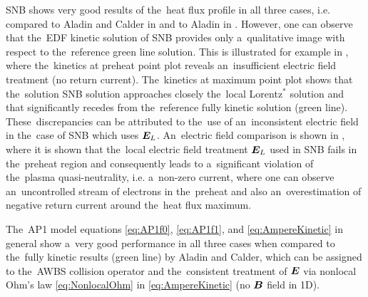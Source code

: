 SNB shows very good results of the~heat flux profile in all three cases, 
i.e. compared to Aladin and Calder in  
and to Aladin in . 
However, one can observe that the~EDF kinetic solution of SNB provides 
only a~qualitative image with respect to the~reference green line solution. 
This is illustrated for example in
, where the~kinetics at preheat point plot 
reveals an~insufficient electric field treatment (no return current). 
The~kinetics at maximum point plot shows that the~solution SNB solution
approaches closely the~local Lorentz$^*$ solution and that 
significantly recedes from the~reference fully kinetic solution (green line).
These~discrepancies can be attributed to the~use of an~inconsistent 
electric field in the~case of SNB which uses $\boldsymbol{E}_L$. An~electric field 
comparison is shown in , where it is shown that 
the~local electric field treatment $\boldsymbol{E}_L$ used in SNB fails 
in the~preheat region and consequently leads to 
a~significant violation of the~plasma quasi-neutrality,
i.e. a~non-zero current, where one can observe an~uncontrolled stream of 
electrons in the~preheat and also an~overestimation of negative return current
around the~heat flux maximum.

The~AP1 model equations \eqref{eq:AP1f0}, \eqref{eq:AP1f1}, 
and \eqref{eq:AmpereKinetic} in general show a~very good performance 
in all three cases when compared to the~fully kinetic results 
(green line) by Aladin and Calder, which can be assigned 
to the~AWBS collision operator and the~consistent 
treatment of $\boldsymbol{E}$ via nonlocal Ohm's law \eqref{eq:NonlocalOhm} in
 \eqref{eq:AmpereKinetic} (no $\boldsymbol{B}$ field in 1D).

